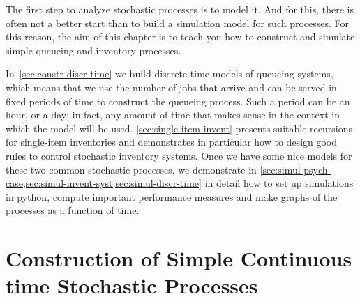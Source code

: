 The first step to analyze stochastic processes is to model it.
And for this, there is often not a better start than to build a simulation model for such processes.
For this reason, the aim of  this chapter is to teach you how to construct  and simulate simple queueing and inventory processes.

In~\cref{sec:constr-discr-time} we build discrete-time models of queueing systems, which means that we use the number of jobs that arrive and can be served in fixed periods of time to construct the queueing process.
Such a period can be an hour, or a day; in fact, any amount of time that makes sense in the context in which the model will be used.
\cref{sec:single-item-invent} presents suitable recursions for single-item inventories and demonstrates in particular how to design good rules to control stochastic inventory systems.
Once we have some nice models for these two common stochastic processes, we demonstrate in \cref{sec:simul-psych-case,sec:simul-invent-syst,sec:simul-discr-time} in detail how to set up simulations in python, compute important performance measures and make graphs of the processes as a function of time.





%




\chapter{Construction of Simple Continuous time Stochastic Processes}
\label{cha:continuous-time}

